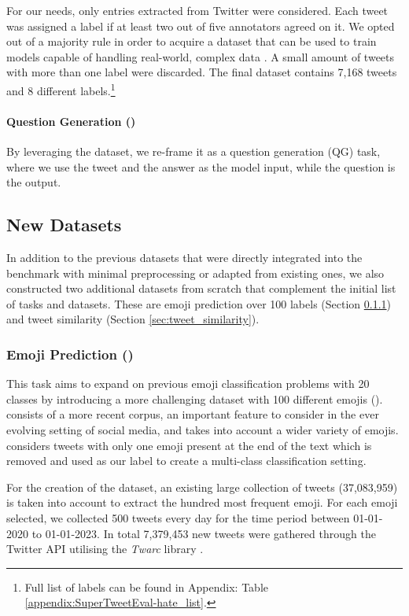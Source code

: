 For our needs, only entries extracted from Twitter were considered. Each tweet was assigned a label if at least two out of five annotators agreed on it. We opted out of a majority rule in order to acquire a dataset that can be used to train models capable of handling real-world, complex data \cite{mohammad2018semeval,antypas2022twitter}. A small amount of tweets with more than one label were discarded. The final dataset contains 7,168 tweets and 8 different labels.\footnote{Full list of labels can be found in Appendix: Table \ref{appendix:SuperTweetEval-hate_list}.} 

\paragraph{Question Generation ({\TweetQG})} By leveraging the {\TweetQA} dataset, we re-frame it as a question generation (QG) task, where we use the tweet and the answer as the model input, while the question is the output.

\subsection{New Datasets}
In addition to the previous datasets that were directly integrated into the benchmark with minimal preprocessing or adapted from existing ones, we also constructed two additional datasets from scratch that complement the initial list of tasks and datasets. These are emoji prediction over 100 labels (Section \ref{sec:emoji_classication}) and tweet similarity (Section \ref{sec:tweet_similarity}).


\subsubsection{Emoji Prediction ({\TweetEmoji})}
\label{sec:emoji_classication}
This task aims to expand on previous emoji classification problems with 20 classes \cite{barbieri2017emojis, barbieri-etal-2018-semeval} by introducing a more challenging dataset with 100 different emojis ({\TweetEmoji}). {\TweetEmoji} consists of a more recent corpus, an important feature to consider in the ever evolving setting of social media, and takes into account a wider variety of emojis. {\TweetEmoji} considers tweets with only one emoji present at the end of the text which is removed and used as our label to create a multi-class classification setting.

For the creation of the dataset, an existing large collection of tweets (37,083,959) \cite{loureiro-etal-2022-timelms} is taken into account to extract the hundred most frequent emoji. For each emoji selected, we collected 500 tweets every day for the time period between 01-01-2020 to 01-01-2023. In total 7,379,453 new tweets were gathered through the Twitter \ac{API} utilising the \textit{Twarc} library \cite{twarc}.

